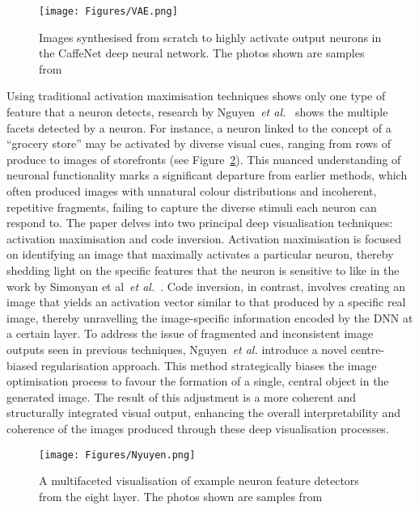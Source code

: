 \begin{figure}[ht!]
	\begin{center}
		\texttt{[image: Figures/VAE.png]}
	\end{center}
	\caption{Images synthesised from scratch to highly activate output neurons in the CaffeNet deep
neural network. The photos shown are samples from~\cite{NguyenDYBC16}}
	\label{Fig:VAE}
\end{figure} 
Using traditional activation maximisation techniques shows only one type of feature that a neuron detects, research by Nguyen~\textit{et al.}~\cite{NguyenYC16} shows the multiple facets detected by a neuron. For instance, a neuron linked to the concept of a ``grocery store'' may be activated by diverse visual cues, ranging from rows of produce to images of storefronts (see Figure~\ref{Fig:VAE_2}). This nuanced understanding of neuronal functionality marks a significant departure from earlier methods, which often produced images with unnatural colour distributions and incoherent, repetitive fragments, failing to capture the diverse stimuli each neuron can respond to. The paper delves into two principal deep visualisation techniques: activation maximisation and code inversion. Activation maximisation is focused on identifying an image that maximally activates a particular neuron, thereby shedding light on the specific features that the neuron is sensitive to like in the work by Simonyan et al~\textit{et al.}~\cite{SimonyanVZ13}. Code inversion, in contrast, involves creating an image that yields an activation vector similar to that produced by a specific real image, thereby unravelling the image-specific information encoded by the DNN at a certain layer. To address the issue of fragmented and inconsistent image outputs seen in previous techniques, Nguyen~\textit{et al.} introduce a novel centre-biased regularisation approach. This method strategically biases the image optimisation process to favour the formation of a single, central object in the generated image. The result of this adjustment is a more coherent and structurally integrated visual output, enhancing the overall interpretability and coherence of the images produced through these deep visualisation processes.

\begin{figure}[ht!]
	\begin{center}
		\texttt{[image: Figures/Nyuyen.png]}
	\end{center}
	\caption{A multifaceted visualisation of example neuron feature detectors from the eight layer. The photos shown are samples from~\cite{NguyenYC16}}
	\label{Fig:VAE_2}
\end{figure} 

